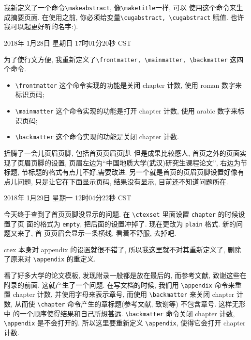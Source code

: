\documentclass{cugrep}
\begin{document}
我新定义了一个命令\verb|\makeabstract|, 像\verb|\maketitle|一样, 可以
使用这个命令来生成摘要页面. 在使用之前, 你必须给变量\verb|\cugabstract, \cugabstract| 赋值. 也许我可以起更好听的名字:).

2018年 1月28日 星期日 17时01分20秒 CST

为了使行文方便, 我重新定义了\verb|\frontmatter, \mainmatter, \backmatter| 这四个命令. 

\begin{itemize}
    \item \verb|\frontmatter| 这个命令实现的功能是关闭 chapter 计数, 使用 roman 数字来标识页码;
    \item \verb|\mainmatter| 这个命令实现的功能是打开 chapter 计数, 使用 arabic 数字来标识页码;
    \item \verb|\backmatter| 这个命令实现的功能是关闭 chapter 计数.
\end{itemize}

折腾了一会儿页眉页脚, 包括首页页眉页脚. 但是成果比较感人, 首页之外的页面实现了页眉页脚的设置,
页眉左边为``中国地质大学(武汉)研究生课程论文'', 右边为节标题, 节标题的格式有点儿不好,需要改进.
另一个就是首页的页眉页脚设置好像有点儿问题, 只是让它在下面显示页码, 结果没有显示, 目前还不知道问题所在. 

2018年 1月29日 星期一 12时04分22秒 CST

今天终于查到了首页页脚没显示的问题. 在 \verb|\ctexset| 里面设置 \verb|chapter| 的时候设置了页
面的格式为 \verb|empty|, 把后面的设置冲掉了. 现在更改为 \verb|plain| 格式. 新的问题又来了, 首
页页眉会显示一条横线, 看着不舒服, 去掉吧. 

ctex 本身对 appendix 的设置就很不错了, 所以我这里就不对其重新定义了, 删除了原来对 \verb|\appendix|
的重定义. 

看了好多大学的论文模板, 发现附录一般都是放在最后的, 而参考文献, 致谢这些在附录的前面. 这就产生了一个问题.
在写文档的时候, 我们用 \verb|\appendix| 命令来重置 chapter 计数, 并使用字母来表示章号, 而使用 \verb|\backmatter| 
来关闭 chapter 计数, 从而使 \verb|\chapter| 命令产生的章标题(参考文献, 致谢等) 不包含章号. 这样无形中
的一个顺序使得结果和自己所想甚远. \verb|\backmatter| 命令关闭 chapter 计数, \verb|\appendix| 是不会打开的.
所以这里要重新定义 \verb|\appendix|, 使得它会打开 chapter 计数. 
\end{document}
